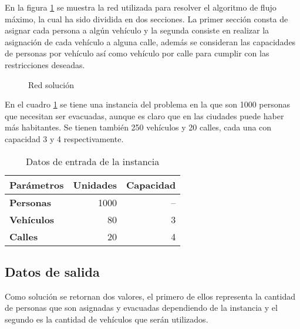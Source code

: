 \documentclass{article}
\begin{document}
En la figura \ref{Grafos2} se muestra la red utilizada para resolver el algoritmo de flujo máximo, la cual ha sido dividida en dos secciones. La primer sección consta de asignar cada persona a algún vehículo y la segunda consiste en realizar la asignación de cada vehículo a alguna calle, además se consideran las capacidades de personas por vehículo así como vehículo por calle para cumplir con las restricciones deseadas.

\begin{figure}[H]
\centering
{}\hspace{5mm}
\caption{Red solución} \label{Grafos2}
\end{figure}

En el cuadro \ref{cuadro1} se tiene una instancia del problema en la que son 1000 personas que necesitan ser evacuadas, aunque es claro que en las ciudades puede haber más habitantes. Se tienen también 250 vehículos y 20 calles, cada una con capacidad 3 y 4 respectivamente. 

\begin{table}[H]
\centering
\caption{Datos de entrada de la instancia}
\begin{tabular}{|l|r|r|}
\hline
\textbf{Parámetros} & \multicolumn{1}{l|}{\textbf{Unidades}} & \multicolumn{1}{l|}{\textbf{Capacidad}} \\ \hline
\textbf{Personas}   & 1000                                   & --                                      \\ \hline
\textbf{Vehículos}  & 80                                     & 3                                       \\ \hline
\textbf{Calles}     & 20                                     & 4                                       \\ \hline
\end{tabular}
\label{cuadro1}
\end{table}


\subsection*{Datos de salida}

Como solución se retornan dos valores, el primero de ellos representa la cantidad de personas que son asignadas y evacuadas dependiendo de la instancia y el segundo es la cantidad de vehículos que serán utilizados. 
\end{document}

